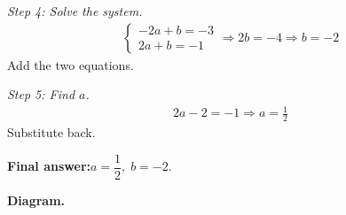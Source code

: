 \documentclass[11pt]{article}
\begin{document}
\textit{Step 4: Solve the system.}
\[\begin{gathered}
\begin{cases} -2a + b = -3 \\ 2a + b = -1 \end{cases} \Rightarrow 2b = -4 \Rightarrow b = -2
\end{gathered}\]
Add the two equations.

\textit{Step 5: Find \( a \).}
\[\begin{gathered}
2a - 2 = -1 \Rightarrow a = \tfrac{1}{2}
\end{gathered}\]
Substitute back.

\begin{answerbox}
\textbf{Final answer:}\quad \(\displaystyle  a = \dfrac{1}{2},\; b = -2 \).
\end{answerbox}
\textbf{Diagram.}
\end{document}
